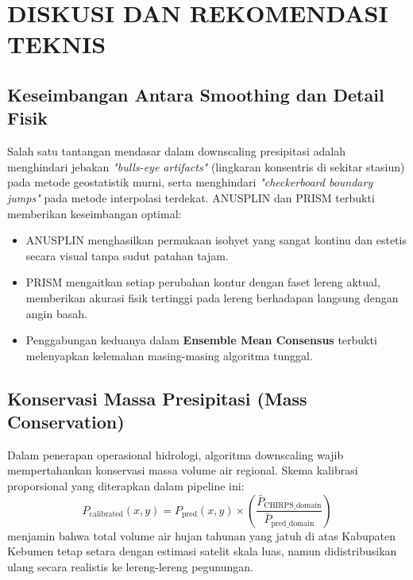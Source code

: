 \documentclass[11pt,a4paper]{article}
\begin{document}
\section{DISKUSI DAN REKOMENDASI TEKNIS}

\subsection{Keseimbangan Antara Smoothing dan Detail Fisik}
Salah satu tantangan mendasar dalam downscaling presipitasi adalah menghindari jebakan \textit{"bulls-eye artifacts"} (lingkaran konsentris di sekitar stasiun) pada metode geostatistik murni, serta menghindari \textit{"checkerboard boundary jumps"} pada metode interpolasi terdekat. ANUSPLIN dan PRISM terbukti memberikan keseimbangan optimal:
\begin{itemize}
    \item ANUSPLIN menghasilkan permukaan isohyet yang sangat kontinu dan estetis secara visual tanpa sudut patahan tajam.
    \item PRISM mengaitkan setiap perubahan kontur dengan faset lereng aktual, memberikan akurasi fisik tertinggi pada lereng berhadapan langsung dengan angin basah.
    \item Penggabungan keduanya dalam \textbf{Ensemble Mean Consensus} terbukti melenyapkan kelemahan masing-masing algoritma tunggal.
\end{itemize}

\subsection{Konservasi Massa Presipitasi (Mass Conservation)}
Dalam penerapan operasional hidrologi, algoritma downscaling wajib mempertahankan konservasi massa volume air regional. Skema kalibrasi proporsional yang diterapkan dalam pipeline ini:
\begin{equation}
    P_{\text{calibrated}}(x, y) = P_{\text{pred}}(x, y) \times \left( \frac{\bar{P}_{\text{CHIRPS\_domain}}}{\bar{P}_{\text{pred\_domain}}} \right)
\end{equation}
menjamin bahwa total volume air hujan tahunan yang jatuh di atas Kabupaten Kebumen tetap setara dengan estimasi satelit skala luas, namun didistribusikan ulang secara realistis ke lereng-lereng pegunungan.
\end{document}
